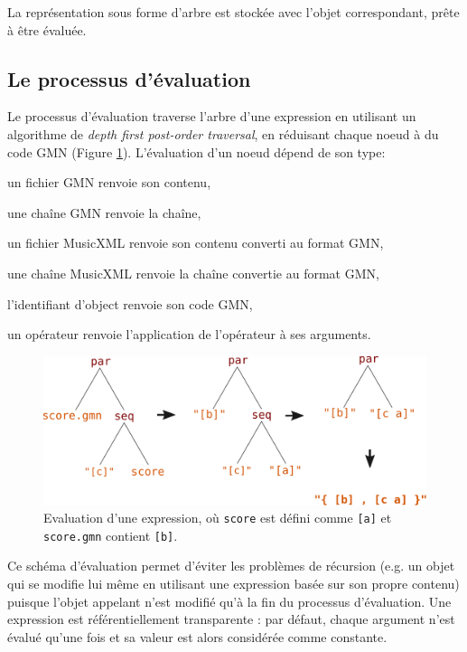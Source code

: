 \documentclass{article}
\newcommand{\OSC}[1]{\texttt{#1}}
\let\olditemize\itemize
\let\oldenditemize\enditemize
\renewenvironment{itemize} 	{\olditemize \setlength{\itemsep}{1mm}}{\oldenditemize}
\begin{document}
La représentation sous forme d'arbre est stockée avec l'objet correspondant, prête à être évaluée.

\subsection{Le processus d'évaluation}
Le processus d'évaluation traverse l'arbre d'une expression en utilisant un algorithme de \textit{depth first post-order traversal}, en réduisant chaque noeud à du code GMN (Figure \ref{fig:classicEval}).
L'évaluation d'un noeud dépend de son type:
\begin{itemize}
\item un fichier GMN renvoie son contenu,
\item une chaîne GMN renvoie la chaîne,
\item un fichier MusicXML renvoie son contenu converti au format GMN,
\item une chaîne MusicXML renvoie la chaîne convertie au format GMN,
\item l'identifiant d'object renvoie son code GMN,
\item un opérateur renvoie l'application de l'opérateur à ses arguments.
\end{itemize}

\begin{figure}[th]
\centering
\includegraphics[width=1\columnwidth]{imgs/classicEval}
\caption{Evaluation d'une expression,
où \OSC{score} est défini comme \OSC{[a]}
et \OSC{score.gmn} contient \OSC{[b]}.
\label{fig:classicEval} }
\end{figure}

Ce schéma d'évaluation permet d'éviter les problèmes de récursion (e.g. un objet qui se modifie lui même en utilisant une expression basée sur son propre contenu) puisque l'objet appelant n'est modifié qu'à la fin du processus d'évaluation. 
Une expression est référentiellement transparente : par défaut, chaque argument n'est évalué qu'une fois et sa valeur est alors considérée comme constante.
\end{document}
